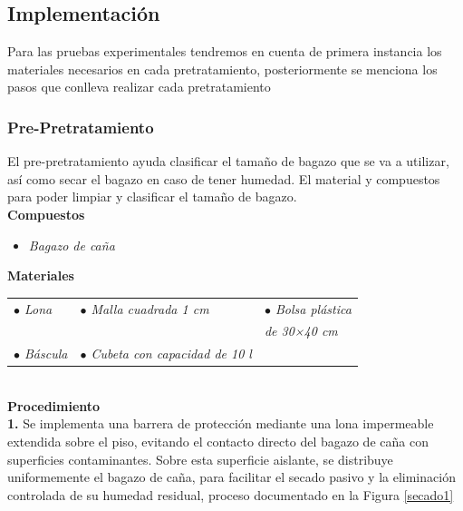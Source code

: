 \documentclass[12pt]{article}
\begin{document}
	
	\newpage
			
			
	
			\subsection{Implementación}

			Para las pruebas experimentales tendremos en cuenta de primera instancia los materiales necesarios en cada pretratamiento, posteriormente se menciona los pasos que conlleva realizar cada pretratamiento
			

			\subsubsection{Pre-Pretratamiento}

			
			El pre-pretratamiento ayuda clasificar el tamaño de bagazo que se va a utilizar, así como secar el bagazo en caso de tener humedad. El material y compuestos para poder limpiar y clasificar el tamaño de bagazo.
			\\[0.5em]
			\textbf{Compuestos} 
			\begin{itemize}[label=\textcolor{blue}{$\bullet$}]
			 \item	\textit{ Bagazo de caña }
			\end{itemize} 
			
			
			\textbf{Materiales} \\[0.5em]
			
			
			\begin{tabular}{p{0.3\textwidth}p{}p{}}
			\textit{	$\bullet$ Lona} &  \textit{$\bullet$  Malla cuadrada 1 cm} & \textit{$\bullet$ Bolsa plástica  }\\
				&&\textit{de 30×40 cm} \\
				\textit{$\bullet$ Báscula} & \textit{$\bullet$ Cubeta con capacidad de 10 l} & 
			\end{tabular}
		\\[0.5em]
			
			
			\textbf{Procedimiento}
			\\[0.5em]
			\textbf{1.} Se implementa una barrera de protección mediante una lona impermeable extendida sobre el piso, evitando el contacto directo del bagazo de caña con superficies contaminantes. Sobre esta superficie aislante, se distribuye uniformemente el bagazo de caña, para facilitar el secado pasivo y la eliminación controlada de su humedad residual, proceso documentado en la Figura \ref{secado1}
\end{document}
